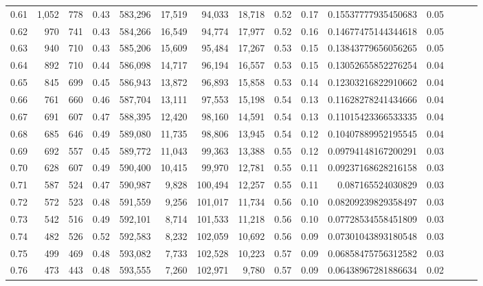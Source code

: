 \begin{tabular}{rrrrrrrrrrrrrrr}
0.61 &   1,052 &    778 &  0.43 &  583,296 &   17,519 &   94,033 &   18,718 &  0.52 &  0.17 &   0.15537777935450683 &      0.05 \\
0.62 &     970 &    741 &  0.43 &  584,266 &   16,549 &   94,774 &   17,977 &  0.52 &  0.16 &   0.14677475144344618 &      0.05 \\
0.63 &     940 &    710 &  0.43 &  585,206 &   15,609 &   95,484 &   17,267 &  0.53 &  0.15 &   0.13843779656056265 &      0.05 \\
0.64 &     892 &    710 &  0.44 &  586,098 &   14,717 &   96,194 &   16,557 &  0.53 &  0.15 &   0.13052655852276254 &      0.04 \\
0.65 &     845 &    699 &  0.45 &  586,943 &   13,872 &   96,893 &   15,858 &  0.53 &  0.14 &   0.12303216822910662 &      0.04 \\
0.66 &     761 &    660 &  0.46 &  587,704 &   13,111 &   97,553 &   15,198 &  0.54 &  0.13 &   0.11628278241434666 &      0.04 \\
0.67 &     691 &    607 &  0.47 &  588,395 &   12,420 &   98,160 &   14,591 &  0.54 &  0.13 &   0.11015423366533335 &      0.04 \\
0.68 &     685 &    646 &  0.49 &  589,080 &   11,735 &   98,806 &   13,945 &  0.54 &  0.12 &   0.10407889952195545 &      0.04 \\
0.69 &     692 &    557 &  0.45 &  589,772 &   11,043 &   99,363 &   13,388 &  0.55 &  0.12 &   0.09794148167200291 &      0.03 \\
0.70 &     628 &    607 &  0.49 &  590,400 &   10,415 &   99,970 &   12,781 &  0.55 &  0.11 &   0.09237168628216158 &      0.03 \\
0.71 &     587 &    524 &  0.47 &  590,987 &    9,828 &  100,494 &   12,257 &  0.55 &  0.11 &     0.087165524030829 &      0.03 \\
0.72 &     572 &    523 &  0.48 &  591,559 &    9,256 &  101,017 &   11,734 &  0.56 &  0.10 &   0.08209239829358497 &      0.03 \\
0.73 &     542 &    516 &  0.49 &  592,101 &    8,714 &  101,533 &   11,218 &  0.56 &  0.10 &   0.07728534558451809 &      0.03 \\
0.74 &     482 &    526 &  0.52 &  592,583 &    8,232 &  102,059 &   10,692 &  0.56 &  0.09 &   0.07301043893180548 &      0.03 \\
0.75 &     499 &    469 &  0.48 &  593,082 &    7,733 &  102,528 &   10,223 &  0.57 &  0.09 &   0.06858475756312582 &      0.03 \\
0.76 &     473 &    443 &  0.48 &  593,555 &    7,260 &  102,971 &    9,780 &  0.57 &  0.09 &   0.06438967281886634 &      0.02 \\

\end{tabular}
